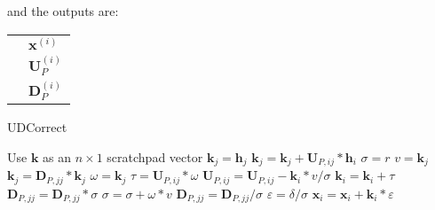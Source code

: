 and the outputs are:

\begin{tabular}{l l}
\phantom{.} & $\mathbf{x}^{(i)}$ \\
\phantom{.} & $\mathbf{U}_P^{(i)}$ \\
\phantom{.} & $\mathbf{D}_P^{(i)}$
\end{tabular}

\begin{algorithm}
    \caption{UDCorrect}
    \label{alg:UDCorrect}
    \begin{algorithmic}
        \STATE Use $\mathbf{k}$ as an $n \times 1$ scratchpad vector
            \STATE $\mathbf{k}_j = \mathbf{h}_j$
                \STATE $\mathbf{k}_j = \mathbf{k}_j + \mathbf{U}_{P,ij} * \mathbf{h}_i$
            \ENDFOR
        \ENDFOR
        \STATE $\sigma = r$
            \STATE $v = \mathbf{k}_j$
            \STATE $\mathbf{k}_j = \mathbf{D}_{P,jj}  * \mathbf{k}_j$
            \STATE $\omega = \mathbf{k}_j$
                \STATE $\tau = \mathbf{U}_{P,ij}  * \omega$
                \STATE $\mathbf{U}_{P,ij} = \mathbf{U}_{P,ij} - \mathbf{k}_i * v / \sigma$
                \STATE $\mathbf{k}_i = \mathbf{k}_i + \tau$
            \ENDFOR
            \STATE $\mathbf{D}_{P,jj} = \mathbf{D}_{P,jj} * \sigma$
            \STATE $\sigma = \sigma + \omega * v$
            \STATE $\mathbf{D}_{P,jj} = \mathbf{D}_{P,jj} / \sigma$
        \ENDFOR
        \STATE $\varepsilon = \delta / \sigma$
            \STATE $\mathbf{x}_i = \mathbf{x}_i + \mathbf{k}_i * \varepsilon$
        \ENDFOR
    \end{algorithmic}
\end{algorithm}

